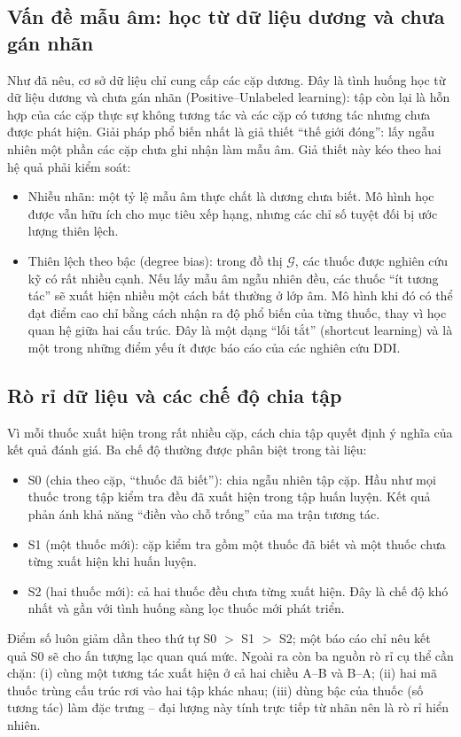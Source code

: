 \documentclass[12pt,a4paper,oneside]{report}
\begin{document}
\subsection{Vấn đề mẫu âm: học từ dữ liệu dương và chưa gán nhãn}
Như đã nêu, cơ sở dữ liệu chỉ cung cấp các cặp dương. Đây là tình huống
học từ dữ liệu dương và chưa gán nhãn (Positive--Unlabeled learning): tập
còn lại là hỗn hợp của các cặp thực sự không tương tác và các cặp có
tương tác nhưng chưa được phát hiện. Giải pháp phổ biến nhất là giả thiết ``thế giới đóng'': lấy ngẫu nhiên một phần các
cặp chưa ghi nhận làm mẫu âm. Giả thiết này kéo theo hai hệ quả phải kiểm soát:
\begin{itemize}
  \item Nhiễu nhãn: một tỷ lệ mẫu âm thực chất là dương chưa biết. Mô
        hình học được vẫn hữu ích cho mục tiêu xếp hạng, nhưng các chỉ số tuyệt
        đối bị ước lượng thiên lệch.
  \item Thiên lệch theo bậc (degree bias): trong đồ thị $\mathcal{G}$,
        các thuốc được nghiên cứu kỹ có rất nhiều cạnh. Nếu lấy mẫu âm ngẫu
        nhiên đều, các thuốc ``ít tương tác'' sẽ xuất hiện nhiều một cách bất
        thường ở lớp âm. Mô hình khi đó có thể đạt điểm cao chỉ bằng cách nhận
        ra độ phổ biến của từng thuốc, thay vì học quan hệ giữa hai cấu
        trúc. Đây là một dạng ``lối tắt'' (shortcut learning) và là một trong
        những điểm yếu ít được báo cáo của các nghiên cứu DDI.
\end{itemize}

\subsection{Rò rỉ dữ liệu và các chế độ chia tập}
Vì mỗi thuốc xuất hiện trong rất nhiều cặp, cách chia tập quyết định ý nghĩa của
kết quả đánh giá. Ba chế độ thường được phân biệt trong tài liệu:
\begin{itemize}
  \item S0 (chia theo cặp, ``thuốc đã biết''): chia ngẫu nhiên tập cặp.
        Hầu như mọi thuốc trong tập kiểm tra đều đã xuất hiện trong tập huấn
        luyện. Kết quả phản ánh khả năng ``điền vào chỗ trống'' của ma trận
        tương tác.
  \item S1 (một thuốc mới): cặp kiểm tra gồm một thuốc đã biết và một
        thuốc chưa từng xuất hiện khi huấn luyện.
  \item S2 (hai thuốc mới): cả hai thuốc đều chưa từng xuất hiện. Đây
        là chế độ khó nhất và gần với tình huống sàng lọc thuốc mới phát triển.
\end{itemize}
Điểm số luôn giảm dần theo thứ tự S0 $>$ S1 $>$ S2; một báo cáo chỉ nêu kết quả
S0 sẽ cho ấn tượng lạc quan quá mức. Ngoài ra còn ba nguồn rò rỉ cụ thể cần
chặn: (i) cùng một tương tác xuất hiện ở cả hai chiều A--B và B--A; (ii) hai mã
thuốc trùng cấu trúc rơi vào hai tập khác nhau; (iii) dùng bậc của thuốc
(số tương tác) làm đặc trưng -- đại lượng này tính trực tiếp từ nhãn nên là rò
rỉ hiển nhiên.
\end{document}
